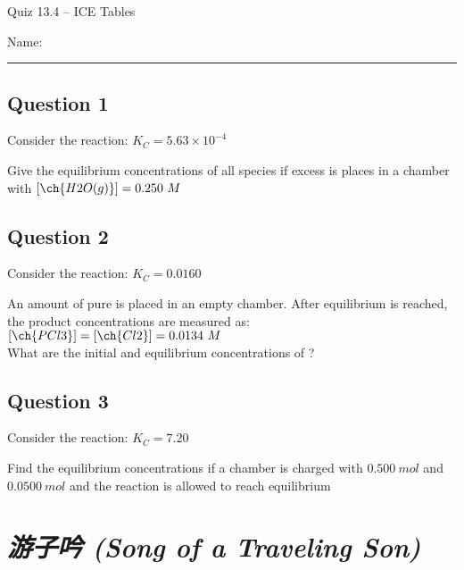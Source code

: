\documentclass[11pt, letterpaper]{memoir}
\begin{document}
	\begin{center}
		{\large	Quiz 13.4 -- ICE Tables}
	\end{center}
	{\large Name: \rule[-1mm]{4in}{.1pt} 
	
	\subsection*{Question 1}
	Consider the reaction:  \hspace{1em} $K_C=5.63\times10^{-4}$ 
	
	\noindent Give the equilibrium concentrations of all species if excess  is places in a chamber with $\left[\ch{H2O(g)}\right]=0.250~M$
	
	\vspace{9em}
	\subsection*{Question 2}
	Consider the reaction:  \hspace{1em} $K_C=0.0160$
	
	\noindent An amount of pure  is placed in an empty chamber. After equilibrium is reached, the product concentrations are measured as: $\left[\ch{PCl3}\right]=\left[\ch{Cl2}\right]=0.0134~M$ \\What are the initial and equilibrium concentrations of ?
	
	\vspace{9em}
	\subsection*{Question 3}
	Consider the reaction:  \hspace{1em} $K_C=7.20$
	
	\noindent Find the equilibrium concentrations if a chamber is charged with $0.500~mol$  and $0.0500~mol$  and the reaction is allowed to reach equilibrium
	\newpage
	\pagestyle{empty}
	\addtocounter{page}{-1}
	\section*{\emph{{游子吟} (Song of a Traveling Son)}}
}
\end{document}
